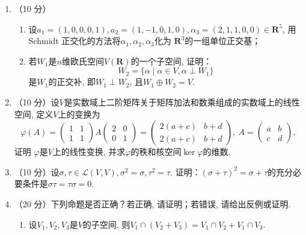 \begin{enumerate}
    \item （10 分）
        \begin{enumerate}
              \item 设\(a_1 = (1,0,0,0,1),a_2 = (1, - 1,0,1,0),\alpha_3 = (2,1,1,0,0) \in \mathbf{R}^{5}\), 用
                    Schmidt 正交化的方法将\(\alpha_1,\alpha_2,\alpha_3\)化为
                    \(\mathbf{R}^3\)的一组单位正交基；

                    \item 若\(W_1\)是\(n\)维欧氏空间\(V( \mathbf{R} )\)的一个子空间, 证明：
                    \[W_2 = \{ \alpha \mid \alpha \in V,\alpha\perp W_1 \}\]
                    是\(W_1\)的正交补, 即\(W_1\perp W_2\), 且\(W_1 \oplus W_2 = V\).
          \end{enumerate}

    \item （10 分）设\(V\)是实数域上二阶矩阵关于矩阵加法和数乘组成的实数域上的线性空间, 定义\(V\)上的变换为
          \[\varphi(A) =
              \begin{pmatrix}
                  1 & 1 \\
                  1 & 1
              \end{pmatrix} A \begin{pmatrix}
                  2 & 0 \\
                  0 & 1
              \end{pmatrix} = \begin{pmatrix}
                  2(a + c) & b + d \\
                  2(a + c) & b + d
              \end{pmatrix},\ A = \begin{pmatrix}
                  a & b \\
                  c & d
              \end{pmatrix},\]
          证明 \(\varphi\)是\(V\)上的线性变换, 并求\(\varphi\)的秩和核空间\(\ker\varphi\)的维数.


    \item （10 分）设\(\sigma,\tau \in \mathcal{L}(V,V),\sigma^2 = \sigma,\tau^2 = \tau\). 证明：\((\sigma + \tau)^2 = \sigma + \tau\)的充分必要条件是\(\sigma\tau = \tau\sigma = 0\).

    \item （20 分）下列命题是否正确？若正确, 请证明；若错误, 请给出反例或证明.
          \begin{enumerate}
              \item 设\(V_1,V_2,V_3\)是\(V\)的子空间, 则\(V_1 \cap ( V_2 + V_3 ) = V_1 \cap V_2 + V_1 \cap V_3\).


\end{enumerate}
\end{enumerate}

